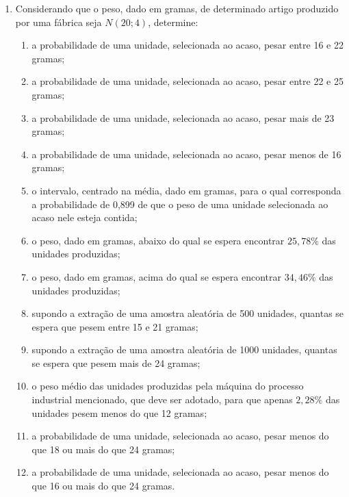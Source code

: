 \begin{enumerate}[resume]
\item Considerando que o peso, dado em gramas, de determinado artigo produzido por uma fábrica seja $N(20 ; 4)$, determine:
	\begin{enumerate}
	\item a probabilidade de uma unidade, selecionada ao acaso, pesar entre 16 e 22 gramas;
	\item a probabilidade de uma unidade, selecionada ao acaso, pesar entre 22 e 25 gramas;
	\item a probabilidade de uma unidade, selecionada ao acaso, pesar mais de 23 gramas;
	\item a probabilidade de uma unidade, selecionada ao acaso, pesar menos de 16 gramas;
	\item o intervalo, centrado na média, dado em gramas, para o qual corresponda a probabilidade de 0,899 de que o peso de uma unidade selecionada ao acaso nele esteja contida;
	\item o peso, dado em gramas, abaixo do qual se espera encontrar $25,78\%$ das unidades produzidas;
	\item o peso, dado em gramas, acima do qual se espera encontrar $34,46\%$ das unidades produzidas;
	\item supondo a extração de uma amostra aleatória de 500 unidades, quantas se espera que pesem entre 15 e 21 gramas;
	\item supondo a extração de uma amostra aleatória de 1000 unidades, quantas se espera que pesem mais de 24 gramas;
	\item o peso médio das unidades produzidas pela máquina do processo industrial mencionado, que deve ser adotado, para que apenas $2,28\%$ das unidades pesem menos do que 12 gramas;
	\item a probabilidade de uma unidade, selecionada ao acaso, pesar menos do que 18 ou mais do que 24 gramas;
	\item a probabilidade de uma unidade, selecionada ao acaso, pesar menos do que 16 ou mais do que 24 gramas.
	\end{enumerate}


\end{enumerate}
